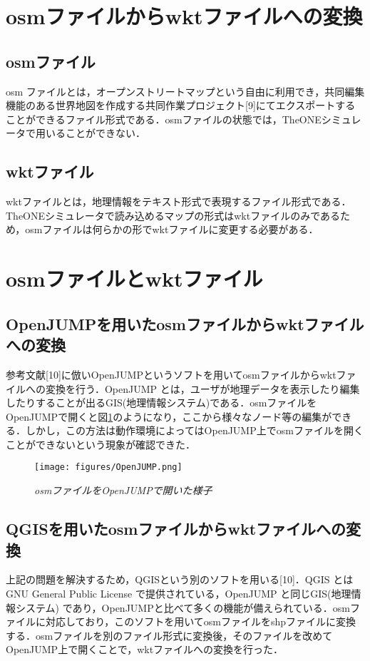 \documentclass[11pt]{icsthesis}
\begin{document}
\section{osmファイルからwktファイルへの変換}



\subsection{osmファイル}
osm ファイルとは，オープンストリートマップという自由に利用でき，共同編集機能のある世界地図を作成する共同作業プロジェクト[9]にてエクスポートすることができるファイル形式である．osmファイルの状態では，TheONEシミュレータで用いることができない．
\subsection{wktファイル}
wktファイルとは，地理情報をテキスト形式で表現するファイル形式である．TheONEシミュレータで読み込めるマップの形式はwktファイルのみであるため，osmファイルは何らかの形でwktファイルに変更する必要がある．
\section{osmファイルとwktファイル}

\subsection{OpenJUMPを用いたosmファイルからwktファイルへの変換}
参考文献[10]に倣いOpenJUMPというソフトを用いてosmファイルからwktファイルへの変換を行う．OpenJUMP とは，ユーザが地理データを表示したり編集したりすることが出るGIS(地理情報システム)である．osmファイルをOpenJUMPで開くと図\ref{OpenJUMP}のようになり，ここから様々なノード等の編集ができる．しかし，この方法は動作環境によってはOpenJUMP上でosmファイルを開くことができないという現象が確認できた．
\begin{figure}[H]
	\centering
	\texttt{[image: figures/OpenJUMP.png]}
\caption[]{\it{osmファイルをOpenJUMPで開いた様子}}
\label{OpenJUMP}
\end{figure}
\subsection{QGISを用いたosmファイルからwktファイルへの変換}
上記の問題を解決するため，QGISという別のソフトを用いる[10]．QGIS とはGNU General Public License で提供されている，OpenJUMP と同じGIS(地理情報システム) であり，OpenJUMPと比べて多くの機能が備えられている．osmファイルに対応しており，このソフトを用いてosmファイルをshpファイルに変換する．osmファイルを別のファイル形式に変換後，そのファイルを改めてOpenJUMP上で開くことで，wktファイルへの変換を行った．
\end{document}
